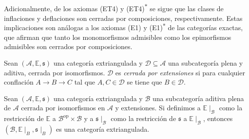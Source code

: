 \documentclass[tesis]{subfiles}
\begin{document}
\begin{Obs}
\begin{itemize}
    \end{itemize}

    \noindent Adicionalmente, de los axiomas (ET4) y (ET4)\textsuperscript{$\ast$} se sigue que las clases de inflaciones y deflaciones son cerradas por composiciones, respectivamente. Estas implicaciones son análogas a los axiomas (E1) y (E1)\textsuperscript{$\ast$} de las categorías exactas, que afirman que tanto los monomorfismos admisibles como los epimorfismos admisibles son cerrados por composiciones. %
\end{Obs}

\begin{Def}\cite[Definition 2.17]{NakaokaPalu}\label{NakaokaPalu-2.17}
    Sean $(\mathscr{A},\mathbb{E},\mathfrak{s})$ una categoría extriangulada y $\mathcal{D}\subseteq\mathscr{A}$ una subcategoría plena y aditiva, cerrada por isomorfismos. $\mathcal{D}$ es \emph{cerrada por extensiones} si para cualquier conflación $A\to B\to C$ tal que $A,C\in\mathcal{D}$ se tiene que $B\in\mathcal{D}$.
\end{Def}

\begin{Obs}\cite[Remark 2.18]{NakaokaPalu}\label{NakaokaPalu-2.18}
    Sean $(\mathscr{A},\mathbb{E},\mathfrak{s})$ una categoría extriangulada y $\mathscr{B}$ una subcategoría aditiva plena de $\mathscr{A}$ cerrada por isomorfismos en $\mathscr{A}$ y extensiones. Si definimos a $\mathbb{E}\mid_\mathscr{B}$ como la restricción de $\mathbb{E}$ a $\mathscr{B}^\text{op}\times\mathscr{B}$ y a $\mathfrak{s}\mid_\mathscr{B}$ como la restricción de $\mathfrak{s}$ a $\mathbb{E}\mid_\mathscr{B}$, entonces $(\mathscr{B},\mathbb{E}\mid_B,\mathfrak{s}\mid_B)$ es una categoría extriangulada. %
\end{Obs}
\end{document}
